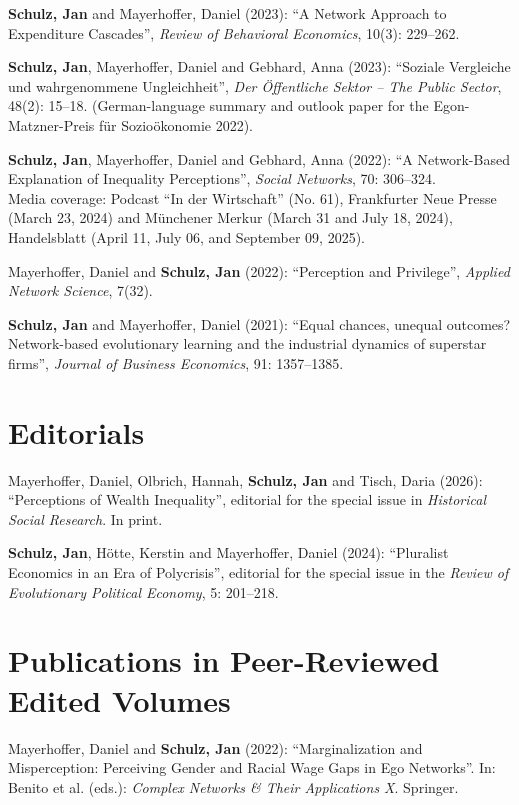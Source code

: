\documentclass[margin]{res}
\begin{document}
\begin{resume}
	\textbf{Schulz, Jan} and Mayerhoffer, Daniel (2023): ``A Network Approach to Expenditure Cascades'', \emph{Review of Behavioral Economics}, 10(3): 229--262.
	
		
	\newpage
	
	\textbf{Schulz, Jan}, Mayerhoffer, Daniel and Gebhard, Anna (2023): ``Soziale Vergleiche und wahrgenommene Ungleichheit'', \textit{Der \"Offentliche Sektor -- The Public Sector}, 48(2): 15--18. (German-language summary and outlook paper for the Egon-Matzner-Preis f\"ur Sozio\"okonomie 2022).

	\textbf{Schulz, Jan}, Mayerhoffer, Daniel and Gebhard, Anna (2022): ``A Network-Based Explanation of Inequality Perceptions'', \textit{Social Networks}, 70: 306--324.\\
	Media coverage: Podcast ``In der Wirtschaft'' (No. 61), Frankfurter Neue Presse (March 23, 2024) and M\"unchener Merkur (March 31 and July 18, 2024), Handelsblatt (April 11, July 06, and September 09, 2025).
	
	Mayerhoffer, Daniel and \textbf{Schulz, Jan} (2022): ``Perception and Privilege'', \textit{Applied Network Science}, 7(32).
	
	\textbf{Schulz, Jan} and Mayerhoffer, Daniel (2021): ``Equal chances, unequal outcomes? Network-based evolutionary learning and the industrial dynamics of superstar firms'', \textit{Journal of Business Economics}, 91: 1357--1385.
	
	\section{Editorials}
	Mayerhoffer, Daniel, Olbrich, Hannah, \textbf{Schulz, Jan} and Tisch, Daria (2026): ``Perceptions of Wealth Inequality'', editorial for the special issue in \textit{Historical Social Research}. In print.
	
	\textbf{Schulz, Jan}, H\"otte, Kerstin and Mayerhoffer, Daniel (2024): ``Pluralist Economics in an Era of Polycrisis'', editorial for the special issue in the \emph{Review of Evolutionary Political Economy}, 5: 201--218.
	
	\section{Publications in Peer-Reviewed Edited Volumes} Mayerhoffer, Daniel and \textbf{Schulz, Jan} (2022): ``Marginalization and Misperception: Perceiving Gender and Racial Wage Gaps in Ego Networks''. In: Benito et al. (eds.): \textit{Complex Networks \& Their Applications X}. Springer.
	

\end{resume}
\end{document}
